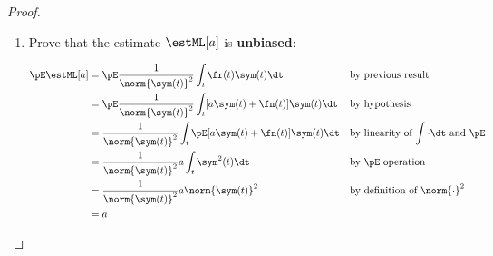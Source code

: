 \begin{proof}
\begin{enumerate}
\item Prove that the estimate $\estML[a]$ is {\bf unbiased}:

\begin{align*}
   \pE\estML[a]
     &= \pE\frac{1}{\norm{\sym(t)}^2} \int_t \fr(t)\sym(t) \dt
     && \text{by previous result}
   \\&= \pE\frac{1}{\norm{\sym(t)}^2} \int_t [ a \sym(t)+\fn(t)]\sym(t) \dt
     && \text{by hypothesis}
   \\&= \frac{1}{\norm{\sym(t)}^2} \int_t \pE[ a \sym(t)+\fn(t)]\sym(t) \dt
     && \text{by linearity of $\int\cdot\dt$ and $\pE$}
   \\&= \frac{1}{\norm{\sym(t)}^2}  a  \int_t \sym^2(t) \dt
     && \text{by $\pE$ operation}
   \\&= \frac{1}{\norm{\sym(t)}^2}  a  \norm{\sym(t)}^2
     && \text{by definition of $\norm{\cdot}^2$}
   \\&= a 
\end{align*}


\end{enumerate}
\end{proof}
